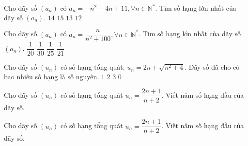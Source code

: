 \begin{ex}%
	Cho dãy số $\left(a_n\right)$ có $a_n=-n^2+4n+11,\forall n\in \mathbb{N}^*$. Tìm số hạng  lớn nhất của dãy số $\left(a_n\right)$.
	 \choice
		 {$14$}
		 {\True $15$}
		 {$13$}
		{$12$} 
\end{ex}

\begin{ex}%
	Cho dãy số $\left(a_n\right)$ có $a_n=\dfrac{n}{n^2+100},\forall n\in \mathbb{N}^*$. Tìm số hạng lớn nhất của dãy số $\left(a_n\right)$. 
	\choice 
		 {\True $\dfrac{1}{20}$}
		{$\dfrac{1}{30}$} 
		 {$\dfrac{1}{25}$}
		{$\dfrac{1}{21}$} 
\end{ex}

\begin{ex}%
	Cho dãy số $(u_n)$ có số hạng tổng quát:  $u_n = 2n+\sqrt{n^2+4}$. Dãy số đã cho có bao nhiêu số hạng là số nguyên.
	 \choice
		 {$1$}
		 {$2$}
		{$3$} 
		{\True$0$} 
\end{ex}

\begin{bt}%
	Cho dãy số $(u_n)$ có  số hạng tổng quát $u_n=\dfrac{2n+1}{n+2}$. Viết năm số hạng đầu của dãy số.
\end{bt}

\begin{ex}%
	Cho dãy số $(u_n)$ có số hạng tổng quát $u_n=\dfrac{2n+1}{n+2}$. Viết  năm số hạng đầu của dãy số.
\end{ex}

